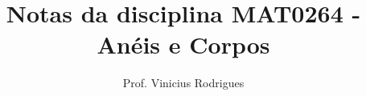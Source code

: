 \documentclass{book}
\author{Prof. Vinicius Rodrigues}
\title{Notas da disciplina MAT0264 - Anéis e Corpos}
\theoremstyle{definition}
\begin{document}
\frontmatter
\begin{titlepage}
    \maketitle
\end{titlepage}
\tableofcontents

\mainmatter






\backmatter
\end{document}
